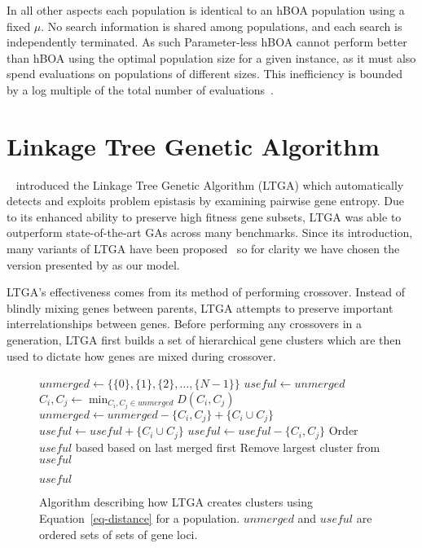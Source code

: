 In all other aspects each population is identical to an hBOA population using a fixed $\mu$. No search information
is shared among populations, and each search is independently terminated. As such Parameter-less hBOA cannot
perform better than hBOA using the optimal population size for a given instance, as it must also spend evaluations
on populations of different sizes. This inefficiency is bounded by a log multiple of the total number of
evaluations~\citep{pelikan:1999:worstparameter-less}.

\section{Linkage Tree Genetic Algorithm}
~\cite{thierens:2010:ltga} introduced the Linkage Tree Genetic Algorithm (LTGA) which automatically
detects and exploits problem epistasis by examining pairwise gene entropy. Due to its enhanced
ability to preserve high fitness gene subsets, LTGA was able to outperform state-of-the-art
GAs across many benchmarks. Since its introduction, many variants of LTGA have been
proposed~\citep{goldman:2012:ltga} so for clarity we have chosen the version
presented by \cite{thierens:2013:ltgahiff} as our model.

LTGA's effectiveness comes from its method of performing crossover. Instead of blindly
mixing genes between parents, LTGA attempts to preserve important interrelationships
between genes. Before performing any crossovers in a generation, LTGA first builds
a set of hierarchical gene clusters which are then used to dictate how genes are mixed
during crossover.

\begin{figure}
  \begin{algorithmic}[1]
    \State $unmerged \leftarrow \{\{0\}, \{1\}, \{2\}, \dots, \{N-1\}\}$
    \State $useful \leftarrow unmerged$
      \State $C_i, C_j \leftarrow \min_{C_i,C_j \in unmerged} D(C_i, C_j)$
      \State $unmerged \leftarrow unmerged - \{C_i, C_j\} + \{C_i \cup C_j\}$
      \State $useful \leftarrow useful + \{C_i \cup C_j\}$
        \State $useful \leftarrow useful - \{C_i, C_j\}$
      \EndIf
    \EndWhile
    \State Order $useful$ based based on last merged first\label{fig-cluster-creation-ordering}
    \State Remove largest cluster from $useful$

    \Return $useful$
  \EndProcedure
\end{algorithmic}
  \caption{Algorithm describing how LTGA creates clusters using Equation~\ref{eq-distance}
           for a population. $unmerged$ and $useful$ are ordered sets of sets of gene loci.}
  \label{fig-cluster-creation}
\end{figure}

